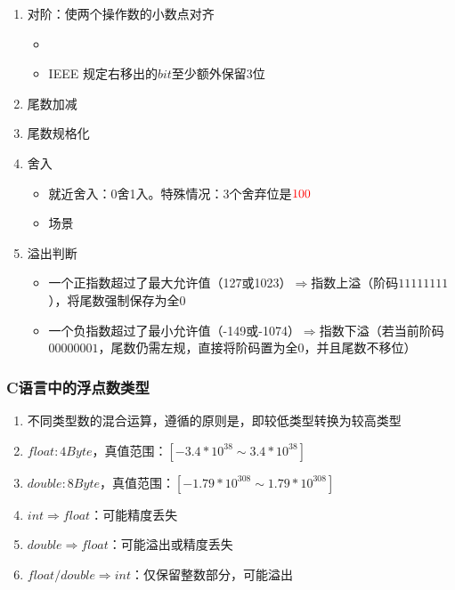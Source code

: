 \documentclass[./computer-organization-and-architecture.tex]{subfiles}
\begin{document}
    \begin{enumerate}
        \item 对阶：使两个操作数的小数点对齐
        \begin{itemize}
            \item {\color{customgreen}{小阶码向大阶码看齐}}
            \item IEEE 规定右移出的$bit$至少额外保留3位
        \end{itemize}
        \item 尾数加减
        \item 尾数规格化
        \item 舍入
        \begin{itemize}
            \item 就近舍入：0舍1入。特殊情况：3个舍弃位是${\color{red}{100}}$
            \item 场景
        \end{itemize}
        \item 溢出判断
        \begin{itemize}
            \item 一个正指数超过了最大允许值（127或1023）$\Rightarrow$指数上溢（阶码$1111 1111$），将尾数强制保存为全0
            \item 一个负指数超过了最小允许值（-149或-1074）$\Rightarrow$指数下溢（若当前阶码$0000 0001$，尾数仍需左规，直接将阶码置为全0，并且尾数不移位）
        \end{itemize}
    \end{enumerate}

    \subsubsection{C语言中的浮点数类型}

    \begin{enumerate}
        \item 不同类型数的混合运算，遵循的原则是{\color{customgreen}{类型提升}}，即较低类型转换为较高类型
        \item $float: 4Byte$，真值范围：$[-3.4*10^{38} \sim 3.4 * 10^{38}]$
        \item $double: 8Byte$，真值范围：$[-1.79*10^{308} \sim 1.79 * 10^{308}]$
        \item $int \Rightarrow float$：可能精度丢失
        \item $double \Rightarrow float$：可能溢出或精度丢失
        \item $float/double \Rightarrow int$：仅保留整数部分，可能溢出
    \end{enumerate}
\end{document}
